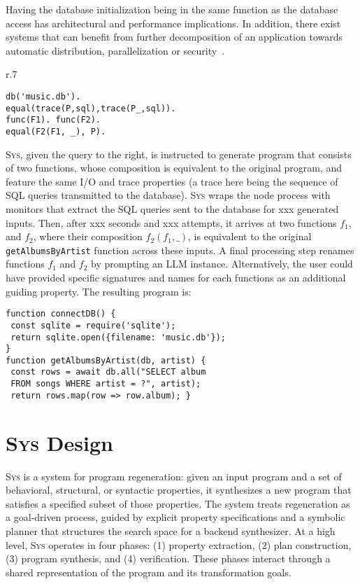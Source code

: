 \documentclass[sigplan]{acmart}
\newcommand{\sys}{{\scshape Sys}\xspace}
\newcommand{\heading}[1]{\vspace{2pt}\noindent\textbf{\emph{#1}}:\enspace}
\newcommand{\ttt}[1]{\texttt{#1}}
\newcommand{\xxx}{\colorbox{red!30}{xxx}\xspace}
\begin{document}
Having the database initialization being in the same function as 
the database access has architectural and performance implications.
In addition, there exist systems that can benefit from further decomposition
of an application towards automatic distribution, parallelization or security~\cite{Towards_Modern_Ghemaw_2023, vasilakis2019ignis, vasilakis2018breakapp}.
\begin{wrapfigure}[6]{r}{.7\columnwidth}
  \vspace{-10pt}
  \begin{verbatim}
db('music.db').
equal(trace(P,sql),trace(P_,sql)).
func(F1). func(F2).
equal(F2(F1, _), P).
\end{verbatim}
\end{wrapfigure}
\sys, given the query to the right, is instructed 
to generate program that consists of two functions,
whose composition is equivalent to the original program, and feature 
the same I/O and trace properties (a trace here being the sequence of SQL 
queries transmitted to the database).
\sys wraps the node process with monitors that extract the SQL queries 
sent to the database for \xxx generated inputs.
Then, after \xxx seconds and \xxx attempts, it arrives at two functions $f_1$, and 
$f_2$, where their composition $f_2(f_1, \_)$, is equivalent to the original \ttt{getAlbumsByArtist} function across these inputs.
A final processing step renames functions $f_1$ and $f_2$ by prompting an LLM instance.
Alternatively, the user could have provided specific signatures and names for each 
functions as an additional guiding property.
The resulting program is:
\begin{verbatim}
function connectDB() {
 const sqlite = require('sqlite');
 return sqlite.open({filename: 'music.db'}); 
}
function getAlbumsByArtist(db, artist) {
 const rows = await db.all("SELECT album
 FROM songs WHERE artist = ?", artist);
 return rows.map(row => row.album); }
\end{verbatim}


\section{\sys Design}

\sys is a system for program regeneration: given an input program and a set of
behavioral, structural, or syntactic properties, it synthesizes a new program
that satisfies a specified subset of those properties. The system treats
regeneration as a goal-driven process, guided by explicit property
specifications and a symbolic planner that structures the search space for a
backend synthesizer.
At a high level, \sys operates in four phases: (1) property extraction, (2)
plan construction, (3) program synthesis, and (4) verification. These phases
interact through a shared representation of the program and its transformation
goals.
\end{document}
